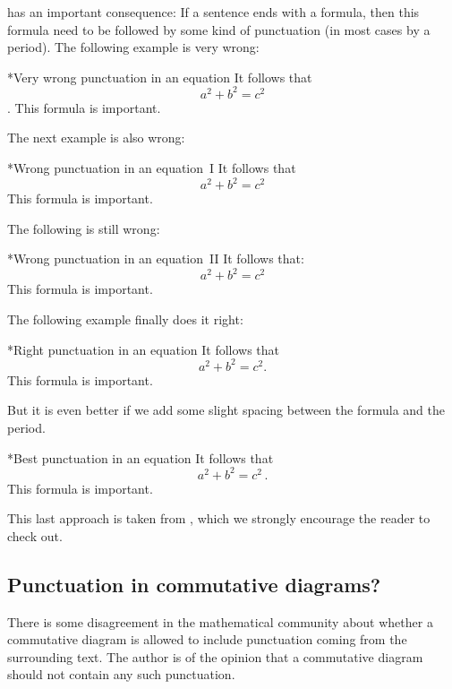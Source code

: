 has an important consequence:
If a sentence ends with a formula, then this formula need to be followed by some kind of punctuation (in most cases by a period).
The following example is very wrong:
\begin{showlatex}*{Very wrong punctuation in an equation}
It follows that
\[
  a^2 + b^2 = c^2
\]
.
This formula is important.
\end{showlatex}
The next example is also wrong:
\begin{showlatex}*{Wrong punctuation in an equation~I}
It follows that
\[
  a^2 + b^2 = c^2
\]
This formula is important.
\end{showlatex}
The following is still wrong:
\begin{showlatex}*{Wrong punctuation in an equation~II}
It follows that:
\[
  a^2 + b^2 = c^2
\]
This formula is important.
\end{showlatex}
The following example finally does it right:
\begin{showlatex}*{Right punctuation in an equation}
It follows that
\[
  a^2 + b^2 = c^2.
\]
This formula is important.
\end{showlatex}
But it is even better if we add some slight spacing between the formula and the period.
\begin{showlatex}*{Best punctuation in an equation}
It follows that
\[
  a^2 + b^2 = c^2 \,.
\]
This formula is important.
\end{showlatex}
This last approach is taken from \cite{tex_period}, which we strongly encourage the reader to check out.




\subsection{Punctuation in commutative diagrams?}

There is some disagreement in the mathematical community about whether a commutative diagram is allowed to include punctuation coming from the surrounding text.
The author is of the opinion that a commutative diagram should not contain any such punctuation.

